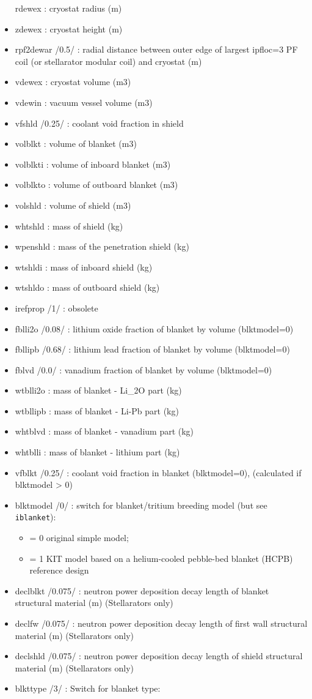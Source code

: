 \documentclass[]{article}
\begin{document}
\begin{itemize}
  rdewex : cryostat radius (m)
\item
  zdewex : cryostat height (m)
\item
  rpf2dewar /0.5/ : radial distance between outer edge of largest
  ipfloc=3 PF coil (or stellarator modular coil) and cryostat (m)
\item
  vdewex : cryostat volume (m3)
\item
  vdewin : vacuum vessel volume (m3)
\item
  vfshld /0.25/ : coolant void fraction in shield
\item
  volblkt : volume of blanket (m3)
\item
  volblkti : volume of inboard blanket (m3)
\item
  volblkto : volume of outboard blanket (m3)
\item
  volshld : volume of shield (m3)
\item
  whtshld : mass of shield (kg)
\item
  wpenshld : mass of the penetration shield (kg)
\item
  wtshldi : mass of inboard shield (kg)
\item
  wtshldo : mass of outboard shield (kg)
\item
  irefprop /1/ : obsolete
\item
  fblli2o /0.08/ : lithium oxide fraction of blanket by volume
  (blktmodel=0)
\item
  fbllipb /0.68/ : lithium lead fraction of blanket by volume
  (blktmodel=0)
\item
  fblvd /0.0/ : vanadium fraction of blanket by volume (blktmodel=0)
\item
  wtblli2o : mass of blanket - Li\_2O part (kg)
\item
  wtbllipb : mass of blanket - Li-Pb part (kg)
\item
  whtblvd : mass of blanket - vanadium part (kg)
\item
  whtblli : mass of blanket - lithium part (kg)
\item
  vfblkt /0.25/ : coolant void fraction in blanket (blktmodel=0),
  (calculated if blktmodel \textgreater{} 0)
\item
  blktmodel /0/ : switch for blanket/tritium breeding model (but see
  \texttt{iblanket}):

  \begin{itemize}
  \itemsep1pt\parskip0pt
  \item
    = 0 original simple model;
  \item
    = 1 KIT model based on a helium-cooled pebble-bed blanket (HCPB)
    reference design
  \end{itemize}
\item
  declblkt /0.075/ : neutron power deposition decay length of blanket
  structural material (m) (Stellarators only)
\item
  declfw /0.075/ : neutron power deposition decay length of first wall
  structural material (m) (Stellarators only)
\item
  declshld /0.075/ : neutron power deposition decay length of shield
  structural material (m) (Stellarators only)
\item
  blkttype /3/ : Switch for blanket type:


\end{itemize}
\end{document}
